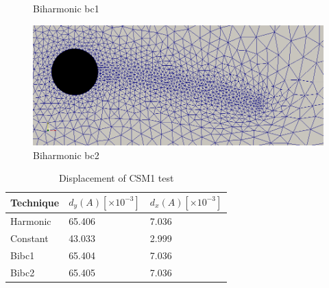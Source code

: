 \begin{figure}[H]
\begin{minipage}[b]{0.5\linewidth}
    \caption{Biharmonic bc1} 
    \vspace{4ex}
  \end{minipage}%
  \begin{minipage}[b]{0.5\linewidth}
    \centering
    \includegraphics[scale=0.2]{./Verification_Validation/Mesh_motion_results/CSM1_bibc2.png} 
    \caption{Biharmonic bc2} 
    \vspace{4ex}
  \end{minipage} 
\end{figure}

\begin{table}[H]
\centering
\caption{Displacement of CSM1 test}
\label{my-label}
\begin{tabular}{|l|l|l|}
\hline
Technique & $d_y(A) [\times 10^{-3}]$ & $d_x(A) [\times 10^{-3}]$ \\ \hline
Harmonic & 65.406 & 7.036 \\ \hline
Constant & 43.033 & 2.999 \\ \hline
Bibc1 & 65.404 & 7.036 \\ \hline
Bibc2 & 65.405 & 7.036 \\ \hline
\end{tabular}
\end{table}




